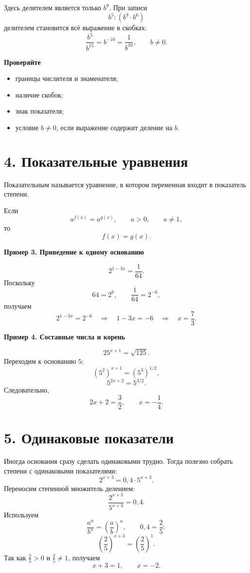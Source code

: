 \documentclass[a4paper,12pt]{article}
\newcommand{\sectionline}{%
    \par\noindent{\color{accent}\rule{\linewidth}{0.7pt}}\par
}
\newcommand{\important}[1]{%
    \par\smallskip
    {\color{darkaccent}\bfseries #1}
    \par\smallskip
}
\begin{document}
Здесь делителем является только \(b^9\). При записи
\[
b^5:(b^9\cdot b^6)
\]
делителем становится всё выражение в скобках:
\[
\frac{b^5}{b^{15}}=b^{-10}=\frac1{b^{10}},\qquad b\ne0.
\]

\important{Проверяйте}

\begin{itemize}
    \item границы числителя и знаменателя;
    \item наличие скобок;
    \item знак показателя;
    \item условие \(b\ne0\), если выражение содержит деление на \(b\).
\end{itemize}

\section*{\color{darkaccent}4. Показательные уравнения}
\sectionline

Показательным называется уравнение, в котором переменная входит в показатель
степени.

Если
\[
a^{f(x)}=a^{g(x)},\qquad a>0,\qquad a\ne1,
\]
то
\[
f(x)=g(x).
\]

\important{Пример 3. Приведение к одному основанию}

\[
2^{1-3x}=\frac1{64}.
\]
Поскольку
\[
64=2^6,\qquad \frac1{64}=2^{-6},
\]
получаем
\[
2^{1-3x}=2^{-6}
\quad\Longrightarrow\quad
1-3x=-6
\quad\Longrightarrow\quad
x=\frac73.
\]

\important{Пример 4. Составные числа и корень}

\[
25^{x+1}=\sqrt{125}.
\]
Переходим к основанию \(5\):
\[
(5^2)^{x+1}=(5^3)^{1/2},
\]
\[
5^{2x+2}=5^{3/2}.
\]
Следовательно,
\[
2x+2=\frac32,
\qquad
x=-\frac14.
\]

\section*{\color{darkaccent}5. Одинаковые показатели}
\sectionline

Иногда основания сразу сделать одинаковыми трудно. Тогда полезно собрать
степени с одинаковыми показателями:
\[
2^{x+3}=0{,}4\cdot 5^{x+3}.
\]
Переносим степенной множитель делением:
\[
\frac{2^{x+3}}{5^{x+3}}=0{,}4.
\]
Используем
\[
\frac{a^n}{b^n}=\left(\frac ab\right)^n,
\qquad
0{,}4=\frac25:
\]
\[
\left(\frac25\right)^{x+3}
=
\left(\frac25\right)^1.
\]
Так как \(\frac25>0\) и \(\frac25\ne1\), получаем
\[
x+3=1,
\qquad
x=-2.
\]
\end{document}
